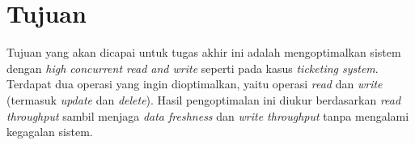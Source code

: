 \section{Tujuan}


Tujuan yang akan dicapai untuk tugas akhir ini adalah mengoptimalkan sistem dengan \textit{high concurrent read and write} seperti pada kasus \textit{ticketing system}. Terdapat dua operasi yang ingin dioptimalkan, yaitu operasi \textit{read} dan \textit{write} (termasuk \textit{update} dan \textit{delete}). Hasil pengoptimalan ini diukur berdasarkan \textit{read throughput} sambil menjaga \textit{data freshness} dan \textit{write throughput} tanpa mengalami kegagalan sistem.